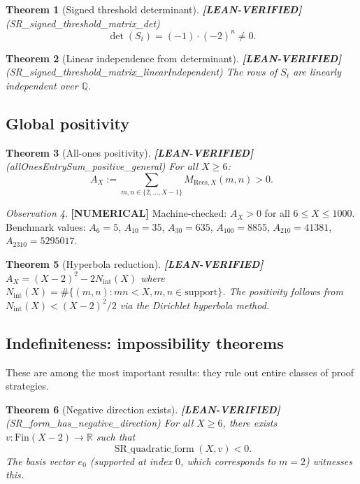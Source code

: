 \documentclass[11pt]{article}
\newtheorem{theorem}{Theorem}[section]
\theoremstyle{remark}
\newtheorem{observation}[theorem]{Observation}
\newcommand{\LEANVERIFIED}{\textbf{\color{green!60!black}[LEAN-VERIFIED]}}
\newcommand{\NUMERICAL}{\textbf{\color{orange}[NUMERICAL]}}
\begin{document}
\begin{theorem}[Signed threshold determinant] \LEANVERIFIED{} \textnormal{(SR\_signed\_threshold\_matrix\_det)}
\[
\det(S_t) = (-1) \cdot (-2)^n \neq 0.
\]
\end{theorem}

\begin{theorem}[Linear independence from determinant] \LEANVERIFIED{} \textnormal{(SR\_signed\_threshold\_matrix\_linearIndependent)}
The rows of $S_t$ are linearly independent over $\mathbb{Q}$.
\end{theorem}

\subsection{Global positivity}

\begin{theorem}[All-ones positivity] \LEANVERIFIED{} \textnormal{(allOnesEntrySum\_positive\_general)}
For all $X \geq 6$:
\[
A_X := \sum_{m,n \in \{2,\ldots,X-1\}} M_{\mathrm{Rees},X}(m,n) > 0.
\]
\end{theorem}

\begin{observation} \NUMERICAL{}
Machine-checked: $A_X > 0$ for all $6 \leq X \leq 1000$.
Benchmark values: $A_6 = 5$, $A_{10} = 35$, $A_{30} = 635$, $A_{100} = 8855$,
$A_{210} = 41381$, $A_{2310} = 5295017$.
\end{observation}

\begin{theorem}[Hyperbola reduction] \LEANVERIFIED{}
$A_X = (X-2)^2 - 2N_{\mathrm{int}}(X)$ where $N_{\mathrm{int}}(X) = \#\{(m,n): mn < X, m,n \in \mathrm{support}\}$.
The positivity follows from $N_{\mathrm{int}}(X) < (X-2)^2/2$ via the Dirichlet hyperbola method.
\end{theorem}

\subsection{Indefiniteness: impossibility theorems}

These are among the most important results: they rule out entire classes of proof strategies.

\begin{theorem}[Negative direction exists] \LEANVERIFIED{} \textnormal{(SR\_form\_has\_negative\_direction)}
For all $X \geq 6$, there exists $v : \mathrm{Fin}(X-2) \to \mathbb{R}$ such that
\[
\operatorname{SR\_quadratic\_form}(X, v) < 0.
\]
The basis vector $e_0$ (supported at index $0$, which corresponds to $m=2$) witnesses this.
\end{theorem}
\end{document}
